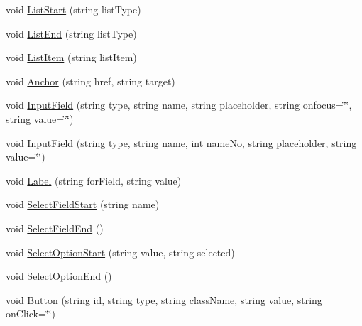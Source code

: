 \begin{DoxyCompactItemize}
\item 
void \hyperlink{classPageStructureMaker_ac24ce26202757aaa30402155daf8a3d0}{List\-Start} (string list\-Type)
\item 
void \hyperlink{classPageStructureMaker_a8578b1555ad2fc92a9efc7dbf7d1fe87}{List\-End} (string list\-Type)
\item 
void \hyperlink{classPageStructureMaker_adf4116e526026edc3c8a3bcf96a7e929}{List\-Item} (string list\-Item)
\item 
void \hyperlink{classPageStructureMaker_a8c0fae5b599182863066de56ae0cea42}{Anchor} (string href, string target)
\item 
void \hyperlink{classPageStructureMaker_a5e5876babd4602e5c799d3f551c7b779}{Input\-Field} (string type, string name, string placeholder, string onfocus=\char`\"{}\char`\"{}, string value=\char`\"{}\char`\"{})
\item 
void \hyperlink{classPageStructureMaker_af528f8da142cbc47585c4dfeded873ba}{Input\-Field} (string type, string name, int name\-No, string placeholder, string value=\char`\"{}\char`\"{})
\item 
void \hyperlink{classPageStructureMaker_ae85f66489db9a65682bb9a2c2128f433}{Label} (string for\-Field, string value)
\item 
void \hyperlink{classPageStructureMaker_ae8684bb66ca463e2f92e09c96137f9e3}{Select\-Field\-Start} (string name)
\item 
void \hyperlink{classPageStructureMaker_a81eb3cdbc840a4c8165cef87330ade09}{Select\-Field\-End} ()
\item 
void \hyperlink{classPageStructureMaker_a77856078e74dab25329132ea07466f92}{Select\-Option\-Start} (string value, string selected)
\item 
void \hyperlink{classPageStructureMaker_a7682f479f7f1012d426ec9f9535def60}{Select\-Option\-End} ()
\item 
void \hyperlink{classPageStructureMaker_a53c013b1d6251be853be8f6c413e3455}{Button} (string id, string type, string class\-Name, string value, string on\-Click=\char`\"{}\char`\"{})
\end{DoxyCompactItemize}
